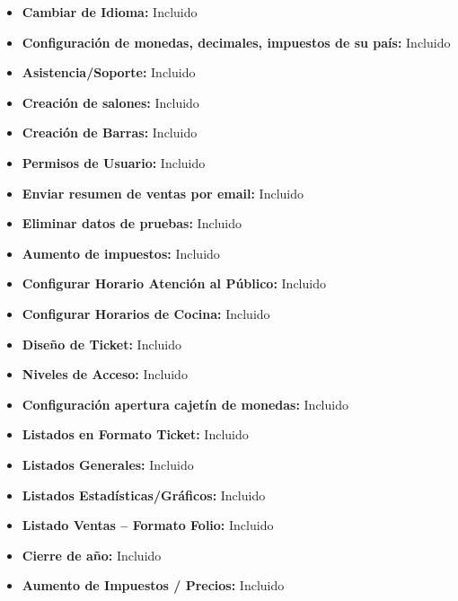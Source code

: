 \documentclass[12pt,a4paper]{article}
\begin{document}
\begin{itemize}
\item \textbf {Cambiar de Idioma: }Incluido
\item \textbf {Configuración de monedas, decimales, impuestos de su país:} Incluido
\item \textbf {Asistencia/Soporte:} Incluido
\item \textbf {Creación de salones:} Incluido
\item \textbf {Creación de Barras:} Incluido
\item \textbf {Permisos de Usuario:} Incluido
\item \textbf {Enviar resumen de ventas por email:} Incluido
\item \textbf {Eliminar datos de pruebas: }Incluido
\item \textbf {Aumento de impuestos:} Incluido
\item \textbf {Configurar Horario Atención al Público:} Incluido
\item \textbf {Configurar Horarios de Cocina: }Incluido
\item \textbf {Diseño de Ticket: }Incluido
\item \textbf {Niveles de Acceso:} Incluido
\item \textbf {Configuración apertura cajetín de monedas:} Incluido
\item \textbf {Listados en Formato Ticket:} Incluido
\item \textbf {Listados Generales: }Incluido
\item \textbf {Listados Estadísticas/Gráficos:} Incluido
\item \textbf {Listado Ventas – Formato Folio:} Incluido
\item \textbf {Cierre de año: }Incluido
\item \textbf {Aumento de Impuestos / Precios:} Incluido\\\\
\end{itemize}
\end{document}
